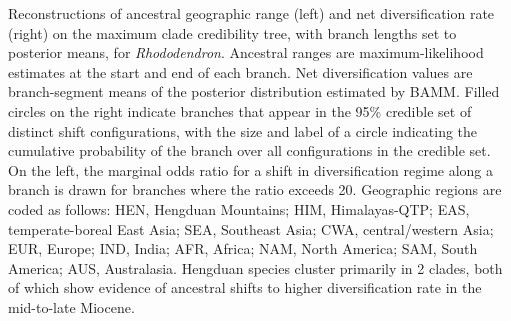 \label{fig:rhododendron}
Reconstructions of ancestral geographic range (left) and net diversification rate (right) on the maximum clade credibility tree, with branch lengths set to posterior means, for \textit{Rhododendron}. Ancestral ranges are maximum-likelihood estimates at the start and end of each branch. Net diversification values are branch-segment means of the posterior distribution estimated by BAMM. Filled circles on the right indicate branches that appear in the 95\% credible set of distinct shift configurations, with the size and label of a circle indicating the cumulative probability of the branch over all configurations in the credible set. On the left, the marginal odds ratio for a shift in diversification regime along a branch is drawn for branches where the ratio exceeds 20. Geographic regions are coded as follows: HEN, Hengduan Mountains; HIM, Himalayas-QTP; EAS, temperate-boreal East Asia; SEA, Southeast Asia; CWA, central/western Asia; EUR, Europe; IND, India; AFR, Africa; NAM, North America; SAM, South America; AUS, Australasia. Hengduan species cluster primarily in 2 clades, both of which show evidence of ancestral shifts to higher diversification rate in the mid-to-late Miocene.